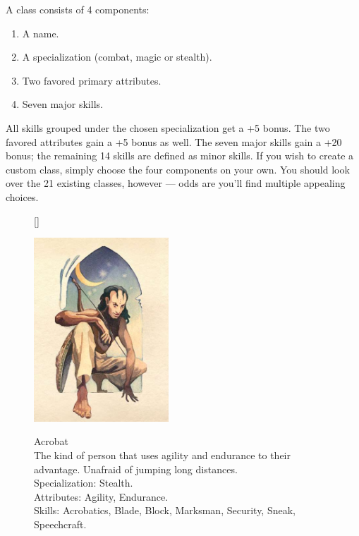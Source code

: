 \documentclass[12pt]{book}
\begin{document}
A class consists of 4 components:
\begin{enumerate}
	\item A name.
	\item A specialization (combat, magic or stealth).
	\item Two favored primary attributes.
	\item Seven major skills.
\end{enumerate}

All skills grouped under the chosen specialization get a +5 bonus. The two favored attributes gain a +5 bonus as well. The seven major skills gain a +20 bonus; the remaining 14 skills are defined as minor skills. If you wish to create a custom class, simply choose the four components on your own. You should look over the 21 existing classes, however --- odds are you'll find multiple appealing choices.\\

\begin{figure}[H]
[\FBwidth]
{\caption*{Acrobat\\

The kind of person that uses agility and endurance to their advantage. Unafraid of jumping long distances.\\

Specialization: Stealth.\\

Attributes: Agility, Endurance.\\

Skills: Acrobatics, Blade, Block, Marksman, Security, Sneak, Speechcraft.}\label{fig:test}}
{\includegraphics[width=0.45\textwidth]{Acrobat.png}}
\end{figure}
\end{document}
